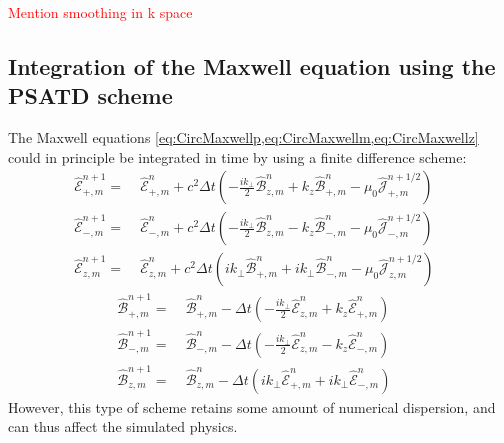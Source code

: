 \documentclass[a4paper]{article}   	%
\newcommand{\tB}[2]{\spectral{B}_{#1,m}^{#2}}
\newcommand{\tE}[2]{\spectral{E}_{#1,m}^{#2}}
\newcommand{\tj}[2]{\spectral{J}_{#1,m}^{#2}}
\newcommand{\comment}[1]{\textcolor{red}{#1}}
\newcommand{\spectral}[1]{\hat{\mathcal{#1}}}
\begin{document}
\comment{Mention smoothing in k space}

\subsection{Integration of the Maxwell equation using the PSATD scheme}
\label{sec:FieldIntegration}

The Maxwell equations
\cref{eq:CircMaxwellp,eq:CircMaxwellm,eq:CircMaxwellz} could in
principle be integrated in time by using a finite difference scheme:
\begin{align*}
\tE{+}{n+1} = \; & \tE{+}{n} + 
c^2\Delta t\left(-\frac{ik_\perp }{2} \tB{z}{n} + k_z\tB{+}{n}
- \mu_0 \tj{+}{n+1/2} \right) & \\
\tE{-}{n+1} =\; & \tE{-}{n} +
c^2\Delta t\left(- \frac{ik_\perp }{2} \tB{z}{n} - k_z\tB{-}{n}
- \mu_0 \tj{-}{n+1/2} \right) &\\
\tE{z}{n+1} =\; & \tE{z}{n} + 
c^2\Delta t\left(ik_\perp \tB{+}{n} + ik_\perp \tB{-}{n}
- \mu_0 \tj{z}{n+1/2} \right)  &
\end{align*}
\begin{align*}
\tB{+}{n+1} = \; & \tB{+}{n} - 
\Delta t\left(-\frac{ik_\perp }{2} \tE{z}{n} + k_z\tE{+}{n}
\right) & \\
\tB{-}{n+1} =\; & \tB{-}{n} - 
\Delta t\left(- \frac{ik_\perp }{2} \tE{z}{n} - k_z\tE{-}{n}
\right) &\\
\tB{z}{n+1} =\; & \tB{z}{n} - 
\Delta t\left(ik_\perp \tE{+}{n} + ik_\perp \tE{-}{n}
\right) &
\end{align*}
However, this type of scheme retains some amount of numerical dispersion, and can
thus affect the simulated physics.
\end{document}
